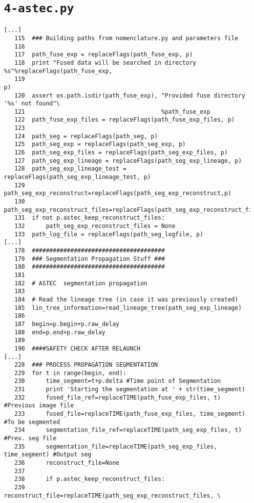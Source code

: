 \documentclass{article}
\begin{document}
\pagebreak
\section{\texttt{4-astec.py}}

\begin{verbatim}
[...]
   115	### Building paths from nomenclature.py and parameters file
   116	
   117	path_fuse_exp = replaceFlags(path_fuse_exp, p)
   118	print "Fused data will be searched in directory %s"%replaceFlags(path_fuse_exp,
   119	                                                                 p)
   120	assert os.path.isdir(path_fuse_exp), "Provided fuse directory '%s' not found"\
   121	                                     %path_fuse_exp
   122	path_fuse_exp_files = replaceFlags(path_fuse_exp_files, p)
   123	
   124	path_seg = replaceFlags(path_seg, p)
   125	path_seg_exp = replaceFlags(path_seg_exp, p)
   126	path_seg_exp_files = replaceFlags(path_seg_exp_files, p)
   127	path_seg_exp_lineage = replaceFlags(path_seg_exp_lineage, p)
   128	path_seg_exp_lineage_test = replaceFlags(path_seg_exp_lineage_test, p)
   129	path_seg_exp_reconstruct=replaceFlags(path_seg_exp_reconstruct,p)
   130	path_seg_exp_reconstruct_files=replaceFlags(path_seg_exp_reconstruct_files,p)
   131	if not p.astec_keep_reconstruct_files:
   132	    path_seg_exp_reconstruct_files = None
   133	path_log_file = replaceFlags(path_seg_logfile, p)
[...]
   178	######################################
   179	### Segmentation Propagation Stuff ###
   180	######################################
   181	
   182	# ASTEC  segmentation propagation
   183	
   184	# Read the lineage tree (in case it was previously created)
   185	lin_tree_information=read_lineage_tree(path_seg_exp_lineage) 
   186	
   187	begin=p.begin+p.raw_delay
   188	end=p.end+p.raw_delay
   189	
   190	####SAFETY CHECK AFTER RELAUNCH
[...]
   228	### PROCESS PROPAGATION SEGMENTATION 
   229	for t in range(begin, end):
   230	    time_segment=t+p.delta #Time point of Segmentation 
   231	    print 'Starting the segmentation at ' + str(time_segment)
   232	    fused_file_ref=replaceTIME(path_fuse_exp_files, t) #Previous image file
   233	    fused_file=replaceTIME(path_fuse_exp_files, time_segment) #To be segmented
   234	    segmentation_file_ref=replaceTIME(path_seg_exp_files, t) #Prev. seg file
   235	    segmentation_file=replaceTIME(path_seg_exp_files, time_segment) #Output seg
   236	    reconstruct_file=None
   237	
   238	    if p.astec_keep_reconstruct_files:
   239	        reconstruct_file=replaceTIME(path_seg_exp_reconstruct_files, \

\end{verbatim}
\end{document}
